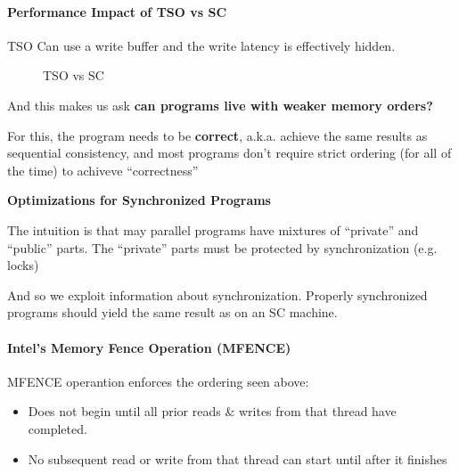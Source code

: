 \paragraph{Performance Impact of TSO vs SC} TSO Can use a write buffer and the write latency is effectively hidden.\\
\begin{figure}[h]
    \begin{minipage}{0.35\textwidth}
        \centering
    \end{minipage}
    \begin{minipage}{0.45\textwidth}
        \centering
    \end{minipage}
    \caption{TSO vs SC}
    \label{fig:tsovssc}
\end{figure}
\par And this makes us ask \textbf{can programs live with weaker memory orders?}
\par For this, the program needs to be \textbf{correct}, a.k.a. achieve the same results as sequential consistency, and most programs don't require strict ordering (for all of the time) to achiveve \enquote{correctness}
\par {\large \textbf{Optimizations for Synchronized Programs}}\\
\begin{minipage}{0.4\textwidth}
    \par The intuition is that may parallel programs have mixtures of \enquote{private} and \enquote{public} parts. The \enquote{private} parts must be protected by synchronization (e.g. locks)
\end{minipage}
\begin{minipage}{0.6\textwidth}
    \raggedright
\end{minipage}
%
\clearpage
%
\par And so we exploit information about synchronization. Properly synchronized programs should yield the same result as on an SC machine.
\paragraph{Intel's Memory Fence Operation (MFENCE)} MFENCE operantion enforces the ordering seen above:
\begin{itemize}
    \item Does not begin until all prior reads \& writes from that thread have completed.
    \item No subsequent read or write from that thread can start until after it finishes
\end{itemize}

